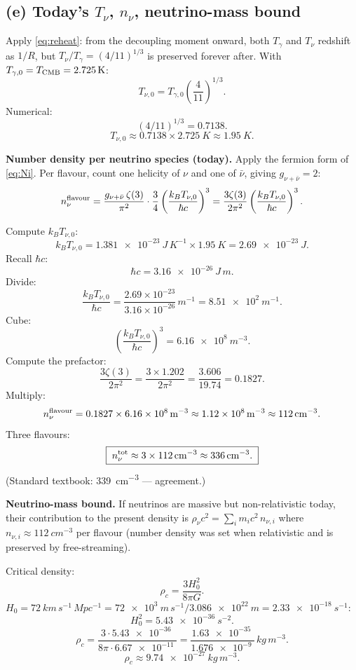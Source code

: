 \documentclass[11pt]{article}
\begin{document}
\subsection*{(e) Today's $T_\nu$, $n_\nu$, neutrino-mass bound}

Apply \eqref{eq:reheat}: from the decoupling moment onward, both $T_\gamma$ and $T_\nu$ redshift as $1/R$, but $T_\nu/T_\gamma = (4/11)^{1/3}$ is preserved forever after. With $T_{\gamma,0} = T_{\rm CMB} = \SI{2.725}{K}$:
\[
T_{\nu,0} = T_{\gamma,0}\left(\frac{4}{11}\right)^{1/3}.
\]
Numerical:
\[
(4/11)^{1/3} = 0.7138.
\]
\[
\boxed{\;T_{\nu,0} \approx 0.7138\times \SI{2.725}{K} \approx \SI{1.95}{K}.\;}
\]

\textbf{Number density per neutrino species (today).} Apply the fermion form of \eqref{eq:Ni}. Per flavour, count one helicity of $\nu$ and one of $\bar\nu$, giving $g_{\nu+\bar\nu} = 2$:
\[
n_\nu^{\rm flavour} = \frac{g_{\nu+\bar\nu}\,\zeta(3)}{\pi^2}\cdot\frac{3}{4}\left(\frac{k_B T_{\nu,0}}{\hbar c}\right)^3 = \frac{3\zeta(3)}{2\pi^2}\left(\frac{k_B T_{\nu,0}}{\hbar c}\right)^3.
\]

Compute $k_B T_{\nu,0}$:
\[
k_B T_{\nu,0} = \SI{1.381e-23}{J\,K^{-1}}\times \SI{1.95}{K} = \SI{2.69e-23}{J}.
\]
Recall $\hbar c$:
\[
\hbar c = \SI{3.16e-26}{J\,m}.
\]
Divide:
\[
\frac{k_B T_{\nu,0}}{\hbar c} = \frac{2.69\times 10^{-23}}{3.16\times 10^{-26}}\,\si{m^{-1}} = \SI{8.51e2}{m^{-1}}.
\]
Cube:
\[
\left(\frac{k_B T_{\nu,0}}{\hbar c}\right)^3 = \SI{6.16e8}{m^{-3}}.
\]
Compute the prefactor:
\[
\frac{3\zeta(3)}{2\pi^2} = \frac{3\times 1.202}{2\pi^2} = \frac{3.606}{19.74} = 0.1827.
\]
Multiply:
\[
n_\nu^{\rm flavour} = 0.1827 \times \SI{6.16e8}{m^{-3}} \approx \SI{1.12e8}{m^{-3}} \approx \SI{112}{cm^{-3}}.
\]
Three flavours:
\[
\boxed{\;n_\nu^{\rm tot} \approx 3\times \SI{112}{cm^{-3}} \approx \SI{336}{cm^{-3}}.\;}
\]
(Standard textbook: \SI{339}{cm^{-3}} --- agreement.)

\textbf{Neutrino-mass bound.} If neutrinos are massive but non-relativistic today, their contribution to the present density is $\rho_\nu c^2 = \sum_i m_i c^2\,n_{\nu,i}$ where $n_{\nu,i}\approx \SI{112}{cm^{-3}}$ per flavour (number density was set when relativistic and is preserved by free-streaming).

Critical density:
\[
\rho_c = \frac{3 H_0^2}{8\pi G}.
\]
$H_0 = \SI{72}{km\,s^{-1}\,Mpc^{-1}} = \SI{72e3}{m\,s^{-1}}/\SI{3.086e22}{m} = \SI{2.33e-18}{s^{-1}}$:
\[
H_0^2 = \SI{5.43e-36}{s^{-2}}.
\]
\[
\rho_c = \frac{3\cdot \SI{5.43e-36}{}}{8\pi\cdot \SI{6.67e-11}{}} = \frac{\SI{1.63e-35}{}}{\SI{1.676e-9}{}}\,\si{kg\,m^{-3}}.
\]
\[
\rho_c \approx \SI{9.74e-27}{kg\,m^{-3}}.
\]
\end{document}
